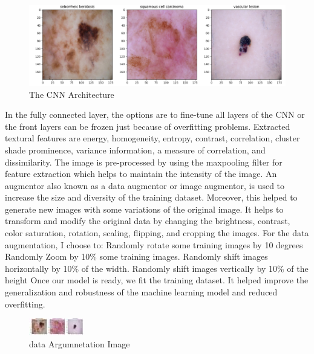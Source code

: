 \documentclass[twocolumn]{article}
\begin{document}
\begin{figure}[H]
  \centering
  \includegraphics[width=\textwidth]{derry.png}
  \caption{The CNN Architecture}
  \label{fig:image}
\end{figure}
In the fully connected layer, the options are to fine-tune all layers of the CNN or the front layers can be frozen just because of overfitting problems.
Extracted textural features are energy, homogeneity, entropy, contrast, correlation, cluster shade
prominence, variance information, a measure of correlation, and dissimilarity. The image is pre-processed by using the maxpooling filter for feature extraction which helps to maintain the intensity of the image.
An augmentor also known as a data augmentor or image augmentor, is used to increase the size and diversity of the training dataset. Moreover, this helped to generate new images with some variations of the original image. It helps to transform and modify the original data by changing the brightness, contrast, color saturation, rotation, scaling, flipping, and cropping the images.
For the data augmentation, I choose to: Randomly rotate some training images by 10 degrees Randomly Zoom by 10\% some training images. Randomly shift images horizontally by 10\% of the width. Randomly shift images vertically by 10\% of the height Once our model is ready, we fit the training dataset. It helped improve the generalization and robustness of the machine learning model and reduced overfitting. 

\begin{figure}
  \centering
  \includegraphics[width=\textwidth]{derry.jpg}
  \caption{data Argumnetation Image}
  \label{fig:image}
\end{figure}
\end{document}

